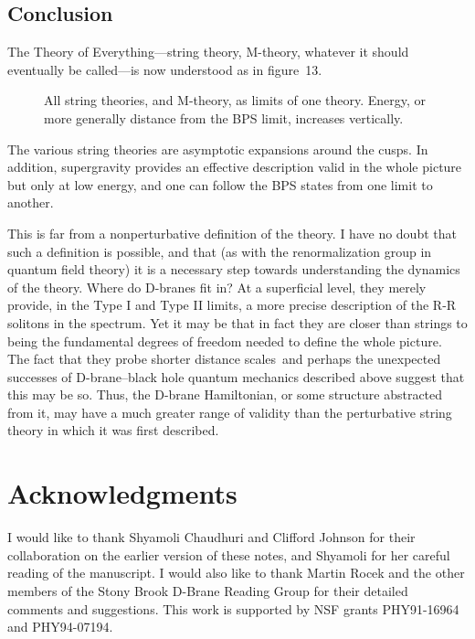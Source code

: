 \subsection{Conclusion}

The Theory of Everything---string theory, M-theory, whatever it should
eventually be called---is now understood as in figure~13.
\begin{figure}
\begin{center}
\leavevmode
{}
\end{center}
\caption[]{All string theories, and M-theory, as limits of one theory. 
Energy, or more generally  distance from the BPS limit, increases vertically.}
\end{figure}
The various string theories are asymptotic expansions around the 
cusps.  In addition, supergravity provides an effective description valid in
the whole picture but only at low energy, and one can follow the
BPS states from one limit to another.

This is far from a nonperturbative definition of the theory.  I have no doubt
that such a definition is possible, and that (as with the renormalization
group in quantum field theory) it is a necessary step towards understanding
the dynamics of the theory. Where do D-branes fit in?  At a superficial
level, they merely provide, in the Type I and Type II limits, a more precise
description of the R-R solitons in the spectrum.  Yet it may be that in fact
they are closer than strings to being the fundamental degrees of freedom
needed to define the whole picture.  The fact that they probe shorter
distance scales\,\cite{short} and perhaps the unexpected successes of 
D-brane--black hole quantum mechanics described above suggest that this may
be so.  Thus, the D-brane Hamiltonian, or some structure abstracted from
it, may have a much greater range of validity than the perturbative
string theory in which it was first described.\cite{bfss}

\section*{Acknowledgments}
I would like to thank Shyamoli Chaudhuri and Clifford Johnson for their
collaboration on the earlier version of these notes, and Shyamoli for her
careful reading of the manuscript.  I would also like to thank Martin
Rocek and the other members of the Stony Brook D-Brane Reading Group for
their detailed comments and suggestions.  This work is supported by NSF grants
PHY91-16964 and PHY94-07194.


